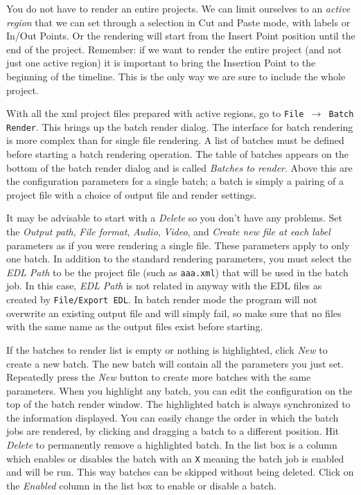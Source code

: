 You do not have to render an entire projects. We can limit ourselves to an \textit{active region}  that we can set through a selection in Cut and Paste mode, with labels or In/Out Points. Or the rendering will start from the Insert Point position until the end of the project. Remember: if we want to render the entire project (and not just one active region) it is important to bring the Insertion Point to the beginning of the timeline. This is the only way we are sure to include the whole project.

With all the \CGG{} xml project files prepared with active regions,
go to \texttt{File $\rightarrow$ Batch Render}. This brings up the
batch render dialog. The interface for batch rendering is more
complex than for single file rendering.  A list of batches must be
defined before starting a batch rendering operation.  The table of
batches appears on the bottom of the batch render dialog and is
called \textit{Batches to render}.  Above this are the configuration
parameters for a single batch; a batch is simply a pairing of a
project file with a choice of output file and render settings.

It may be advisable to start with a \textit{Delete} so you don't have any problems. Set the \textit{Output path}, \textit{File format}, \textit{Audio},
\textit{Video}, and \textit{Create new file at each label}
parameters as if you were rendering a single file.  These parameters
apply to only one batch.  In addition to the standard rendering
parameters, you must select the \textit{EDL Path} to be the project
file (such as \texttt{aaa.xml}) that will be used in the batch
job.  In this case, \textit{EDL Path} is not related in anyway with
the EDL files as created by \texttt{File/Export EDL}.  In batch
render mode the program will not overwrite an existing output file
and will simply fail, so make sure that no files with the same name
as the output files exist before starting.

If the batches to render list is empty or nothing is highlighted,
click \textit{New} to create a new batch. The new batch will contain
all the parameters you just set.  Repeatedly press the \textit{New}
button to create more batches with the same parameters.  When you
highlight any batch, you can edit the configuration on the top of
the batch render window. The highlighted batch is always
synchronized to the information displayed.  You can easily change
the order in which the batch jobs are rendered, by clicking and
dragging a batch to a different position.  Hit \textit{Delete} to
permanently remove a highlighted batch. In the list box is a column
which enables or disables the batch with an \texttt{X} meaning the
batch job is enabled and will be run.  This way batches can be
skipped without being deleted.  Click on the \textit{Enabled} column
in the list box to enable or disable a batch.


